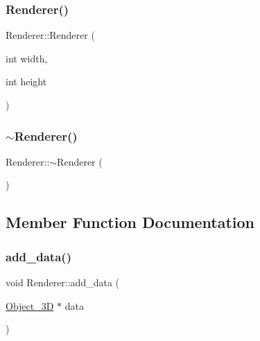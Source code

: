 \mbox{\label{classRenderer_af72dee9cedcc9e481dd3d313bac11b62}} 
\subsubsection{\texorpdfstring{Renderer()}{Renderer()}\hspace{0.1cm}{\footnotesize\ttfamily [2/2]}}
{\footnotesize\ttfamily Renderer\+::\+Renderer (\begin{DoxyParamCaption}\item[{int}]{width,  }\item[{int}]{height }\end{DoxyParamCaption})}

\mbox{\label{classRenderer_afeee408862d5bd6255a6882d47e6d5cd}} 
\subsubsection{\texorpdfstring{$\sim$\+Renderer()}{~Renderer()}}
{\footnotesize\ttfamily Renderer\+::$\sim$\+Renderer (\begin{DoxyParamCaption}{ }\end{DoxyParamCaption})}



\subsection{Member Function Documentation}
\mbox{\label{classRenderer_acdc6907bf1aaf90fe7e11e29f3b6de20}} 
\subsubsection{\texorpdfstring{add\+\_\+data()}{add\_data()}}
{\footnotesize\ttfamily void Renderer\+::add\+\_\+data (\begin{DoxyParamCaption}\item[{\mbox{\hyperlink{classObject__3D}{Object\+\_\+3D}} $\ast$}]{data }\end{DoxyParamCaption})}

